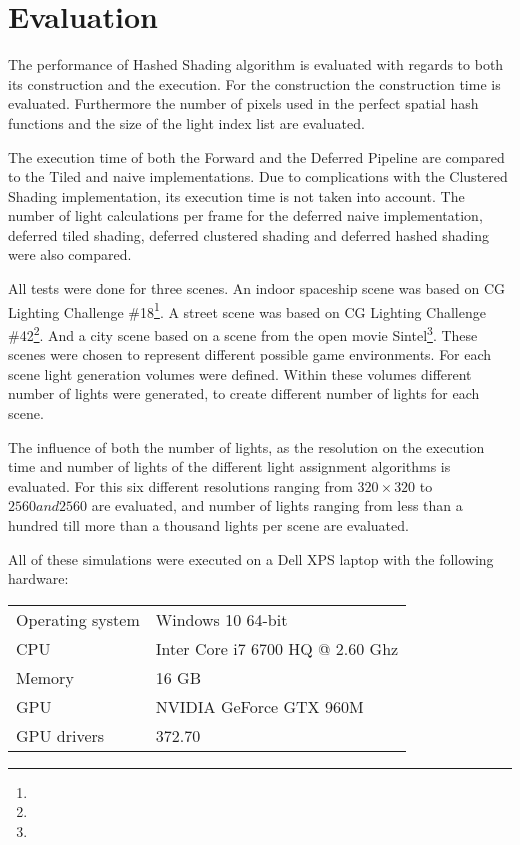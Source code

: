 \section{Evaluation}

The performance of Hashed Shading algorithm is evaluated with regards to both its construction
and the execution. For the construction the construction time is evaluated. Furthermore the
number of pixels used in the perfect spatial hash functions and the size of the light index
list are evaluated.

The execution time of both the Forward and the Deferred Pipeline are compared to the Tiled and
naive implementations. Due to complications with the Clustered Shading implementation, its
execution time is not taken into account. The number of light calculations per frame for
the deferred naive implementation, deferred tiled shading, deferred clustered shading and
deferred hashed shading were also compared.

All tests were done for three scenes. An indoor spaceship scene was based on CG Lighting
Challenge \#18\footnote{}. A street scene was based on CG Lighting Challenge \#42\footnote{}.
And a city scene based on a scene from the open movie Sintel\footnote{}. These scenes were
chosen to represent different possible game environments. For each scene light generation
volumes were defined. Within these volumes different number of lights were generated, to
create different number of lights for each scene.

The influence of both the number of lights, as the resolution on the execution time and
number of lights of the different light assignment algorithms is evaluated. For this six
different resolutions ranging from $320 \times 320$ to $2560 and 2560$ are evaluated, and
number of lights ranging from less than a hundred till more than a thousand lights per
scene are evaluated.

All of these simulations were executed on a Dell XPS laptop with the following hardware:

\begin{table}[h!]
  \begin{tabular}{@{}ll@{}}\toprule
    Operating system       & Windows 10 64-bit                \\
    CPU & Inter Core i7 6700 HQ @ 2.60 Ghz \\
    Memory & 16 GB                            \\
    GPU & NVIDIA GeForce GTX 960M          \\
    GPU drivers & 372.70                           \\ \bottomrule
  \end{tabular}
\end{table}












